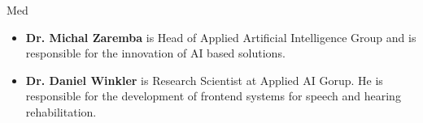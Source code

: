 \begin{sitedescription}{Med}
\begin{itemize} %

\item{\bf Dr. Michal Zaremba} is Head of Applied Artificial Intelligence Group and is responsible for the innovation of AI based solutions.

\item{\bf Dr. Daniel Winkler} is Research Scientist at Applied AI Gorup. He is responsible for the development of frontend systems for speech and hearing rehabilitation.
    
\end{itemize}

\end{sitedescription}


